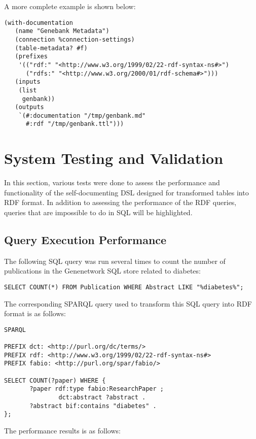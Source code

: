 A more complete example is shown below:

\begin{Verbatim}[frame=single]
(with-documentation
   (name "Genebank Metadata")
   (connection %connection-settings)
   (table-metadata? #f)
   (prefixes
    '(("rdf:" "<http://www.w3.org/1999/02/22-rdf-syntax-ns#>")
      ("rdfs:" "<http://www.w3.org/2000/01/rdf-schema#>")))
   (inputs
    (list
     genbank))
   (outputs
    `(#:documentation "/tmp/genbank.md"
      #:rdf "/tmp/genbank.ttl")))
\end{Verbatim}

\section{System Testing and Validation}

In this section, various tests were done to assess the performance and functionality of the self-documenting DSL designed for transformed tables into RDF format.  In addition to assessing the performance of the RDF queries, queries that are impossible to do in SQL will be highlighted.

\subsection{Query Execution Performance}

The following SQL query was run several times to count the number of publications in the Genenetwork SQL store related to diabetes:

\begin{Verbatim}[frame=single]
  SELECT COUNT(*) FROM Publication WHERE Abstract LIKE "%diabetes%";
\end{Verbatim}

The corresponding SPARQL query used to transform this SQL query into RDF format is as follows:
  
\begin{Verbatim}[frame=single]
SPARQL

PREFIX dct: <http://purl.org/dc/terms/>
PREFIX rdf: <http://www.w3.org/1999/02/22-rdf-syntax-ns#>
PREFIX fabio: <http://purl.org/spar/fabio/>

SELECT COUNT(?paper) WHERE {
       ?paper rdf:type fabio:ResearchPaper ;
               dct:abstract ?abstract .
       ?abstract bif:contains "diabetes" .
};
\end{Verbatim}

The performance results is as follows:

